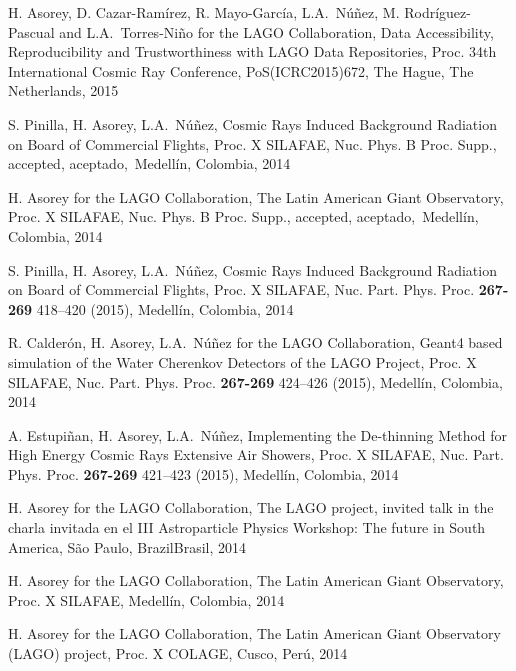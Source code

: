 \begin{etaremune}
\item {}H. Asorey, D. Cazar-Ramírez, R. Mayo-García, L.A.\ Núñez, M. Rodríguez-Pascual and L.A.\ Torres-Niño for the LAGO Collaboration, {{Data Accessibility, Reproducibility and Trustworthiness with LAGO Data Repositories}}, \en Proc.
34th International Cosmic Ray Conference, PoS(ICRC2015)672, The Hague, The Netherlands, 2015

\item {}S. Pinilla, H. Asorey, L.A.\ Núñez, {{Cosmic Rays Induced Background Radiation on Board of Commercial Flights}}, \en Proc.
X SILAFAE, Nuc.
Phys.
B Proc.
Supp., \ifeng accepted, \else aceptado,\fi\ Medellín, Colombia, 2014

\item {}H. Asorey for the LAGO Collaboration, {{The Latin American Giant Observatory}}, \en Proc.
X SILAFAE, Nuc.
Phys.
B Proc.
Supp., \ifeng accepted, \else aceptado,\fi\ Medellín, Colombia, 2014

\item {}S. Pinilla, H. Asorey, L.A.\ Núñez, {{Cosmic Rays Induced Background Radiation on Board of Commercial Flights}}, \en Proc.
X SILAFAE,  Nuc.
Part.
Phys.
Proc. {\textbf{267-269}} 418--420 (2015), Medellín, Colombia, 2014

\item {}R. Calderón, H. Asorey, L.A.\ Núñez for the LAGO Collaboration, {{Geant4 based simulation of the Water Cherenkov Detectors of the LAGO Project}}, \en Proc.
X SILAFAE, Nuc.
Part.
Phys.
Proc. {\textbf{267-269}} 424--426 (2015), Medellín, Colombia, 2014

\item {}A. Estupiñan, H. Asorey, L.A.\ Núñez, {{Implementing the De-thinning Method for High Energy Cosmic Rays Extensive Air Showers}}, \en Proc.
X SILAFAE, Nuc.
Part.
Phys.
Proc. {\textbf{267-269}} 421--423 (2015), Medellín, Colombia, 2014

\item {}H. Asorey for the LAGO Collaboration, {{The LAGO project}}, \ifeng invited talk in the \else charla invitada en el \fi III Astroparticle Physics Workshop: The future in South America, São Paulo, \ifeng Brazil\else Brasil\fi, 2014
  
\item {}H. Asorey for the LAGO Collaboration, {{The Latin American Giant Observatory}}, \en Proc.
X SILAFAE, Medellín, Colombia, 2014

\item {}H. Asorey for the LAGO Collaboration, {{The Latin American Giant Observatory (LAGO) project}}, \en Proc.
X COLAGE, Cusco, Perú, 2014


\end{etaremune}
